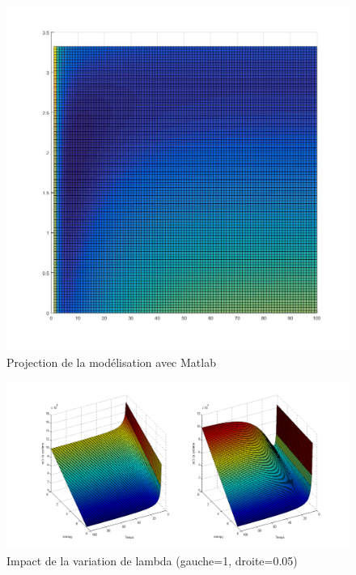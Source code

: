 \begin{figure}[ht]
\centering
     \includegraphics[width=1.0\linewidth]{Paul/Matlab/3D_proj.jpg}
     \caption{Projection de la modélisation avec Matlab}
     \label{normal_case}
\end{figure}

\begin{figure}[ht]
\centering
     \includegraphics[width=1.0\linewidth]{Paul/Matlab/lambda_var.png}
     \caption{Impact de la variation de lambda (gauche=1, droite=0.05)}
     \label{normal_case}
\end{figure}

